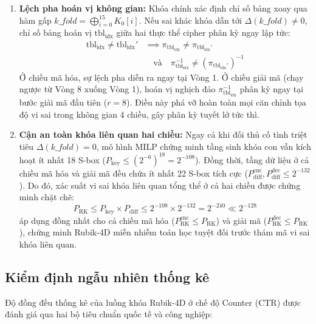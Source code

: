 \documentclass[10pt,twocolumn]{article}
\begin{document}
\begin{enumerate}
    \item \textbf{Lệch pha hoán vị không gian:} Khóa chính xác định chỉ số bảng xoay qua hàm gấp $k\_fold = \bigoplus_{i=0}^{15} K_0[i]$. Nếu sai khác khóa dẫn tới $\Delta(k\_fold) \neq 0$, chỉ số bảng hoán vị $\text{tbl}_{\text{idx}}$ giữa hai thực thể cipher phân kỳ ngay lập tức:
    \begin{equation}
    \begin{aligned}
        \text{tbl}_{\text{idx}} \neq \text{tbl}_{\text{idx}}' &\implies \pi_{\text{tbl}_{\text{idx}}} \neq \pi_{\text{tbl}_{\text{idx}}'} \\
        &\quad \text{và} \quad \pi_{\text{tbl}_{\text{idx}}}^{-1} \neq (\pi_{\text{tbl}_{\text{idx}}'})^{-1}
    \end{aligned}
    \end{equation}
    Ở chiều mã hóa, sự lệch pha diễn ra ngay tại Vòng 1. Ở chiều giải mã (chạy ngược từ Vòng 8 xuống Vòng 1), hoán vị nghịch đảo $\pi_{\text{tbl}_{\text{idx}}}^{-1}$ phân kỳ ngay tại bước giải mã đầu tiên ($r=8$). Điều này phá vỡ hoàn toàn mọi căn chỉnh tọa độ vi sai trong không gian 4 chiều, gây phân kỳ tuyết lở tức thì.
    
    \item \textbf{Cận an toàn khóa liên quan hai chiều:} Ngay cả khi đối thủ cố tình triệt tiêu $\Delta(k\_fold) = 0$, mô hình MILP chứng minh tầng sinh khóa con vẫn kích hoạt ít nhất 18 S-box ($P_{\text{key}} \le (2^{-6})^{18} = 2^{-108}$). Đồng thời, tầng dữ liệu ở cả chiều mã hóa và giải mã đều chứa ít nhất 22 S-box tích cực ($P_{\text{diff}}^{\text{enc}}, P_{\text{diff}}^{\text{dec}} \le 2^{-132}$). Do đó, xác suất vi sai khóa liên quan tổng thể ở cả hai chiều được chứng minh chặt chẽ:
    \begin{equation}
        P_{\text{RK}} \le P_{\text{key}} \times P_{\text{diff}} \le 2^{-108} \times 2^{-132} = 2^{-240} \ll 2^{-128}
    \end{equation}
    áp dụng đồng nhất cho cả chiều mã hóa ($P_{\text{RK}}^{\text{enc}} \le P_{\text{RK}}$) và giải mã ($P_{\text{RK}}^{\text{dec}} \le P_{\text{RK}}$), chứng minh Rubik-4D miễn nhiễm toán học tuyệt đối trước thám mã vi sai khóa liên quan.
\end{enumerate}

\subsection{Kiểm định ngẫu nhiên thống kê}
\label{subsec:randomness}
Độ đồng đều thống kê của luồng khóa Rubik-4D ở chế độ Counter (CTR) được đánh giá qua hai bộ tiêu chuẩn quốc tế và công nghiệp:
\end{document}
